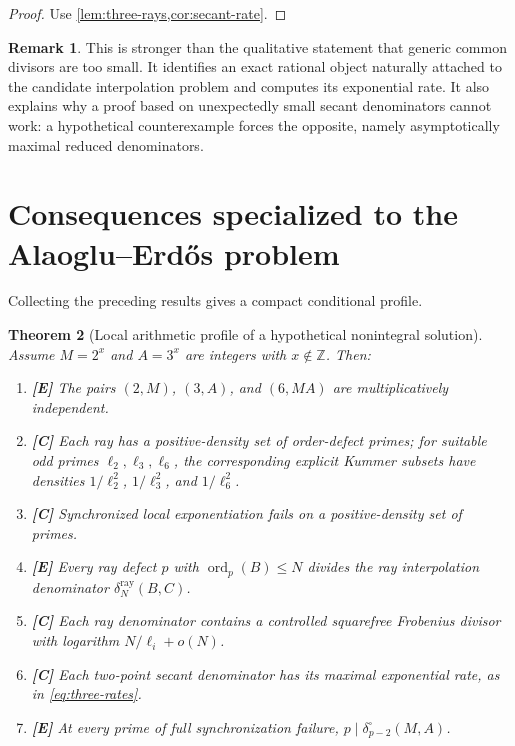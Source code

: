 \documentclass[11pt]{article}
\newtheorem{theorem}{Theorem}[section]
\theoremstyle{definition}
\newtheorem{remark}[theorem]{Remark}
\newcommand{\Z}{\mathbb Z}
\newcommand{\ord}{\operatorname{ord}}
\newcommand{\boxdelta}{\delta^{\square}}
\newcommand{\raydelta}{\delta^{\mathrm{ray}}}
\newcommand{\AEname}{Alaoglu--Erd\H{o}s}
\newcommand{\statusE}{\textcolor{deepgreen}{\textbf{[E]}}}
\newcommand{\statusC}{\textcolor{deepblue}{\textbf{[C]}}}
\begin{document}
\begin{proof}
Use \cref{lem:three-rays,cor:secant-rate}.
\end{proof}

\begin{remark}
This is stronger than the qualitative statement that generic common divisors are too small.
It identifies an exact rational object naturally attached to the candidate interpolation
problem and computes its exponential rate.  It also explains why a proof based on unexpectedly
small secant denominators cannot work: a hypothetical counterexample forces the opposite,
namely asymptotically maximal reduced denominators.
\end{remark}

\section{Consequences specialized to the \AEname{} problem}
\label{sec:specialization}

Collecting the preceding results gives a compact conditional profile.

\begin{theorem}[Local arithmetic profile of a hypothetical nonintegral solution]
\label{thm:profile}
Assume $M=2^x$ and $A=3^x$ are integers with $x\notin\Z$.  Then:
\begin{enumerate}[label=(\arabic*)]
\item \statusE{} The pairs $(2,M)$, $(3,A)$, and $(6,MA)$ are multiplicatively independent.
\item \statusC{} Each ray has a positive-density set of order-defect primes; for suitable odd
primes $\ell_2,\ell_3,\ell_6$, the corresponding explicit Kummer subsets have densities
$1/\ell_2^2$, $1/\ell_3^2$, and $1/\ell_6^2$.
\item \statusC{} Synchronized local exponentiation fails on a positive-density set of primes.
\item \statusE{} Every ray defect $p$ with $\ord_p(B)\le N$ divides the ray interpolation
denominator $\raydelta_N(B,C)$.
\item \statusC{} Each ray denominator contains a controlled squarefree Frobenius divisor with
logarithm $N/\ell_i+o(N)$.
\item \statusC{} Each two-point secant denominator has its maximal exponential rate, as in
\eqref{eq:three-rates}.
\item \statusE{} At every prime of full synchronization failure,
$p\mid\boxdelta_{p-2}(M,A)$.
\end{enumerate}
\end{theorem}
\end{document}
